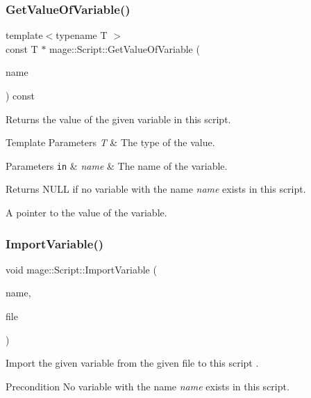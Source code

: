 \subsubsection{\texorpdfstring{Get\+Value\+Of\+Variable()}{GetValueOfVariable()}}
{\footnotesize\ttfamily template$<$typename T $>$ \\
const T $\ast$ mage\+::\+Script\+::\+Get\+Value\+Of\+Variable (\begin{DoxyParamCaption}\item[{const string \&}]{name }\end{DoxyParamCaption}) const}

Returns the value of the given variable in this script.


\begin{DoxyTemplParams}{Template Parameters}
{\em T} & The type of the value. \\
\hline
\end{DoxyTemplParams}

\begin{DoxyParams}[1]{Parameters}
\mbox{\tt in}  & {\em name} & The name of the variable. \\
\hline
\end{DoxyParams}
\begin{DoxyReturn}{Returns}
{\ttfamily N\+U\+LL} if no variable with the name {\itshape name} exists in this script. 

A pointer to the value of the variable. 
\end{DoxyReturn}
\hypertarget{classmage_1_1_script_a2516f50a7ba6497759a872f333f602d3}{}\label{classmage_1_1_script_a2516f50a7ba6497759a872f333f602d3} 
\subsubsection{\texorpdfstring{Import\+Variable()}{ImportVariable()}}
{\footnotesize\ttfamily void mage\+::\+Script\+::\+Import\+Variable (\begin{DoxyParamCaption}\item[{const string \&}]{name,  }\item[{F\+I\+LE $\ast$}]{file }\end{DoxyParamCaption})}

Import the given variable from the given file to this script .

\begin{DoxyPrecond}{Precondition}
No variable with the name {\itshape name} exists in this script. 
\end{DoxyPrecond}

